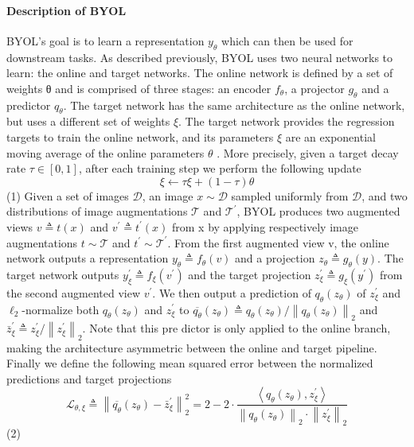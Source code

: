 \documentclass[
]{krantz}
\begin{document}
\hypertarget{description-of-byol}{%
\paragraph{Description of BYOL}\label{description-of-byol}}

BYOL's goal is to learn a representation \(y_θ\) which can then be used for downstream tasks. As described previously, BYOL uses two neural networks to learn: the online and target networks. The online network is defined by a set of weights θ and is comprised of three stages: an encoder \(f_θ\), a projector \(g_θ\) and a predictor \(q_θ\). The target network has the same architecture as the online network, but uses a different set of weights \(\xi\). The target network provides the regression targets to train the online network, and its parameters \(\xi\) are an exponential moving average of the online parameters \(\theta\) . More precisely, given a target decay rate \(\tau \in[0,1]\), after each training step we perform the following update \[\xi \leftarrow \tau \xi+(1-\tau) \theta\] (1)
Given a set of images \(\mathcal{D}\), an image \(x \sim \mathcal{D}\) sampled uniformly from \(\mathcal{D}\), and two distributions of image augmentations \(\mathcal{T}\) and \(\mathcal{T}^{\prime}\), BYOL produces two augmented views \(v \triangleq t(x)\) and \(v^{\prime} \triangleq t^{\prime}(x)\) from x by applying respectively image
augmentations \(t \sim \mathcal{T}\) and \(t^{\prime} \sim \mathcal{T}^{\prime}\). From the first augmented view v, the online network outputs a representation \(y_{\theta} \triangleq f_{\theta}(v)\) and a projection \(z_{\theta} \triangleq g_{\theta}(y)\). The target network outputs \(y_{\xi}^{\prime} \triangleq f_{\xi}(v^{\prime})\) and the target projection \(z_{\xi}^{\prime} \triangleq g_{\xi}(y^{\prime})\)
from the second augmented view \(v^{\prime}\). We then output a prediction of \(q_{\theta}\left(z_{\theta}\right)\) of \(z_{\xi}^{\prime}\) and \(\ell_{2}\)-normalize both \(q_{\theta}\left(z_{\theta}\right)\) and \(z_{\xi}^{\prime}\) to \(\overline{q_{\theta}}\left(z_{\theta}\right) \triangleq q_{\theta}\left(z_{\theta}\right) /\left\|q_{\theta}\left(z_{\theta}\right)\right\|_{2}\) and \(\bar{z}_{\xi}^{\prime} \triangleq z_{\xi}^{\prime} /\left\|z_{\xi}^{\prime}\right\|_{2}\). Note that this pre dictor is only applied to the
online branch, making the architecture asymmetric between the online and target pipeline. Finally we define the following mean squared error between the normalized predictions and target projections
\[\mathcal{L}_{\theta, \xi} \triangleq\left\|\overline{q_{\theta}}\left(z_{\theta}\right)-\bar{z}_{\xi}^{\prime}\right\|_{2}^{2}=2-2 \cdot \frac{\left\langle q_{\theta}\left(z_{\theta}\right), z_{\xi}^{\prime}\right\rangle}{\left\|q_{\theta}\left(z_{\theta}\right)\right\|_{2} \cdot\left\|z_{\xi}^{\prime}\right\|_{2}}\](2)
\end{document}
